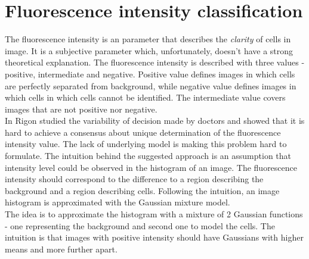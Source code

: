 
\chapter{Fluorescence intensity classification} %

\label{Chapter5} %



The fluorescence intensity is an parameter that describes the \textit{clarity} of cells in image. It is a subjective parameter which, unfortunately, doesn't have a strong theoretical explanation. The fluorescence intensity is described with three values - positive, intermediate and negative. Positive value defines images in which cells are perfectly separated from background, while negative value defines images in which cells in which cells cannot be identified. The intermediate value covers images that are not positive nor negative. \\


In \cite{Rigon2007} Rigon studied the variability of decision made by doctors and showed that it is hard to achieve a consensus about unique determination of the fluorescence intensity value. The lack of underlying model is making this problem hard to formulate. The intuition behind the suggested approach is an assumption that intensity level could be observed in the histogram of an image. The fluorescence intensity should correspond to the difference to a region describing the background and a region describing cells. Following the intuition, an image histogram is approximated with the Gaussian mixture model. \\

The idea is to approximate the histogram with a mixture of 2 Gaussian functions - one representing the background and second one to model the cells. The intuition is that images with positive intensity should have Gaussians with higher means and more further apart. 



